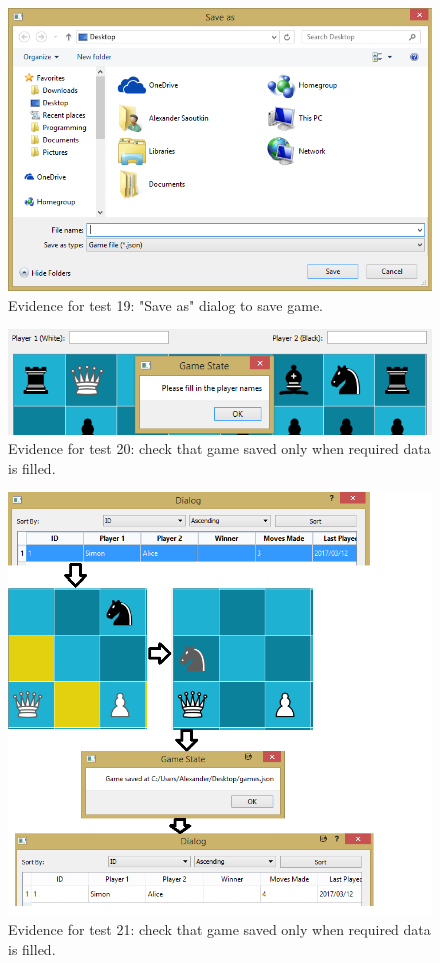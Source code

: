 \begin{figure}[H]
	\centering
	\includegraphics[width=1.0\textwidth]{images/screenshots/test-17}
	\caption{Evidence for test 19: "Save as" dialog to save game.}
	\label{test-19}
\end{figure}
\begin{figure}[H]
	\centering
	\includegraphics[width=1.0\textwidth]{images/screenshots/test-20}
	\caption{Evidence for test 20: check that game saved only when required data is filled.}
	\label{test-20}
\end{figure}
\begin{figure}[H]
	\centering
	\includegraphics[width=1.0\textwidth]{images/screenshots/test-21}
	\caption{Evidence for test 21: check that game saved only when required data is filled.}
	\label{test-21}
\end{figure}
